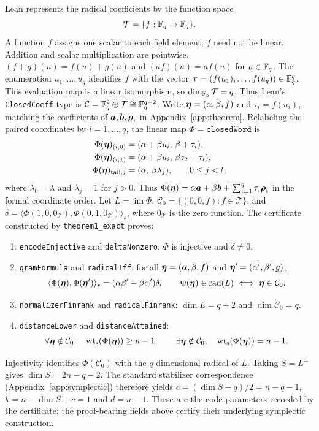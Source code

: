 Lean represents the radical coefficients by the function space
\[
 \mathcal T=\{f:\mathbb{F}_q\to\mathbb{F}_q\}.
\]
A function $f$ assigns one scalar to each field element; $f$ need not be linear. Addition and scalar multiplication are pointwise,
$(f+g)(u)=f(u)+g(u)$ and $(a f)(u)=a f(u)$ for $a\in\mathbb{F}_q$.
The enumeration $u_1,\ldots,u_q$ identifies $f$ with the vector
$\boldsymbol{\tau}=(f(u_1),\ldots,f(u_q))\in\mathbb{F}_q^q$.
This evaluation map is a linear isomorphism, so $\dim_{\mathbb{F}_q}\mathcal T=q$.
Thus Lean's \texttt{ClosedCoeff} type is
$\mathcal C=\mathbb{F}_q^2\oplus\mathcal T\cong\mathbb{F}_q^{q+2}$.
Write $\boldsymbol{\eta}=(\alpha,\beta,f)$ and $\tau_i=f(u_i)$, matching the
coefficients of $\boldsymbol{a},\boldsymbol{b},\boldsymbol{\rho}_i$ in Appendix~\ref{app:theorem}.
Relabeling the paired coordinates by $i=1,\ldots,q$, the linear map
$\Phi=\texttt{closedWord}$ is
\[
\begin{aligned}
 \Phi(\boldsymbol{\eta})_{(i,0)}&=(\alpha+\beta u_i,\,\beta+\tau_i),\\
 \Phi(\boldsymbol{\eta})_{(i,1)}&=(\alpha+\beta u_i,\,\beta z_2-\tau_i),\\
 \Phi(\boldsymbol{\eta})_{\mathrm{tail},j}&=(\alpha,\,\beta\lambda_j),
 \qquad 0\le j<t,
\end{aligned}
\]
where $\lambda_0=\lambda$ and $\lambda_j=1$ for $j>0$.
Thus $\Phi(\boldsymbol{\eta})=\alpha\boldsymbol{a}+\beta\boldsymbol{b}+
\sum_{i=1}^q\tau_i\boldsymbol{\rho}_i$ in the formal coordinate order.
Let $L=\operatorname{im}\Phi$, $\mathcal C_0=
\{(0,0,f):f\in\mathcal T\}$, and
$\delta=\langle\Phi(1,0,0_{\mathcal T}),\Phi(0,1,0_{\mathcal T})\rangle_s$,
where $0_{\mathcal T}$ is the zero function.
The certificate constructed by \texttt{theorem1\_exact} proves:
\begingroup
\renewcommand{\labelenumi}{(\arabic{enumi})}
\begin{enumerate}\setlength{\itemsep}{2pt}
\item \texttt{encodeInjective} and \texttt{deltaNonzero}:
$\Phi$ is injective and $\delta\ne0$.
\item \texttt{gramFormula} and \texttt{radicalIff}: for all
$\boldsymbol{\eta}=(\alpha,\beta,f)$ and
$\boldsymbol{\eta}'=(\alpha',\beta',g)$,
\[
 \langle\Phi(\boldsymbol{\eta}),\Phi(\boldsymbol{\eta}')\rangle_s
 = (\alpha\beta'-\beta\alpha')\delta,
 \qquad \Phi(\boldsymbol{\eta})\in\operatorname{rad}(L)
 \iff \boldsymbol{\eta}\in\mathcal C_0.
\]
\item \texttt{normalizerFinrank} and \texttt{radicalFinrank}:
$\dim L=q+2$ and $\dim\mathcal C_0=q$.
\item \texttt{distanceLower} and \texttt{distanceAttained}:
\[
 \forall\boldsymbol{\eta}\notin\mathcal C_0,\quad
 \operatorname{wt_s}(\Phi(\boldsymbol{\eta}))\ge n-1,
 \qquad
 \exists\boldsymbol{\eta}\notin\mathcal C_0,\quad
 \operatorname{wt_s}(\Phi(\boldsymbol{\eta}))=n-1.
\]
\end{enumerate}
\endgroup
Injectivity identifies $\Phi(\mathcal C_0)$ with the $q$-dimensional
radical of $L$. Taking $S=L^\perp$ gives $\dim S=2n-q-2$.
The standard stabilizer correspondence
(Appendix~\ref{app:symplectic}) therefore yields
$c=(\dim S-q)/2=n-q-1$, $k=n-\dim S+c=1$ and $d=n-1$.
These are the code parameters recorded by the certificate; the
proof-bearing fields above certify their underlying symplectic construction.


